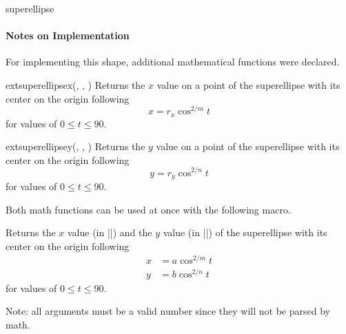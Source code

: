 \begin{ext_shape}{superellipse}
\paragraph{Notes on Implementation}
For implementing this shape, additional mathematical functions were declared.
\begin{math-function}{ext\textunderscore superellipsex(, , )}
Returns the $x$ value on a point of the superellipse with its center on the origin following
\begin{equation*}
   x = r_x\cos^{2/m} t
\end{equation*}
for values of $0 \leq t \leq 90$.
\end{math-function}
\begin{math-function}{ext\textunderscore superellipsey(, , )}
Returns the $y$ value on a point of the superellipse with its center on the origin following
\begin{equation*}
   y = r_y\cos^{2/n} t
\end{equation*}
for values of $0 \leq t \leq 90$.
\end{math-function}

Both \pgfname math functions can be used at once with the following macro.
\begin{command}{\pgfextmathsuperellipseXY{}}
Returns the $x$ value (in |\pgfmathresultX|) and the $y$ value (in |\pgfmathresultY|) of the superellipse with its center on the origin following
\begin{align*}
   x & = a\cos^{2/m} t \\
   y & = b\cos^{2/n} t
\end{align*}
for values of $0 \leq t \leq 90$.

Note: all arguments must be a valid number since they will not be parsed by \pgfname math.
\end{command}


\end{ext_shape}
